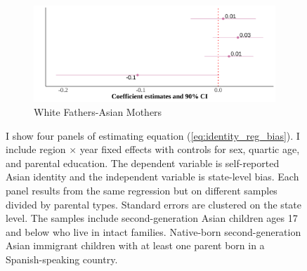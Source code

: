 \documentclass[12pt,english]{article}
\begin{document}
\begin{center}
\begin{figure}[!htb]
\begin{subfigure}{.48\textwidth}
\caption{White Fathers-Asian Mothers}
\centering
\includegraphics[width=.9\linewidth]{figure/by-parents-regs-wh.png}
\end{subfigure}
\caption*{\footnotesize{I show four panels of estimating equation (\ref{eq:identity_reg_bias}). I include region $\times$ year fixed effects with controls for sex, quartic age, and parental education. The dependent variable is self-reported Asian identity and the independent variable is state-level bias. Each panel results from the same regression but on different samples divided by parental types. Standard errors are clustered on the state level. The samples include second-generation Asian children ages 17 and below who live in intact families. Native-born second-generation Asian immigrant children with at least one parent born in a Spanish-speaking country.}}
\end{figure}
\end{center}

\pagebreak
\newpage



\pagebreak
\newpage



\pagebreak
\newpage



\pagebreak
\newpage

\pagebreak
\begingroup
{}
\setlength\bibitemsep{0pt}
\printbibliography
\endgroup
\pagebreak
\end{document}

